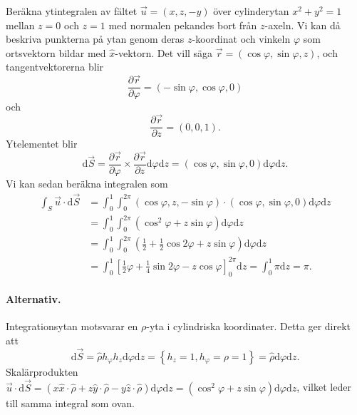 \documentclass[%
oneside,                 %
final,                   %
10pt]{article}
\newenvironment{notice_mdfboxadmon}[1][]{
\begin{notice_mdfboxmdframed}[frametitle=#1]
}
{
\end{notice_mdfboxmdframed}
}
\begin{document}
\begin{notice_mdfboxadmon}

Beräkna ytintegralen av fältet $\vec{u} = (x,z,-y)$ över cylinderytan $x^2 + y^2 = 1$ mellan $z = 0$ och $z = 1$ med normalen pekandes bort från $z$-axeln.  Vi kan då beskriva punkterna på ytan genom deras $z$-koordinat och vinkeln $\varphi$ som ortsvektorn bildar med $\hat{x}$-vektorn.  Det vill säga $\vec{r} = (\cos\varphi , \sin\varphi , z)$, och tangentvektorerna blir
\begin{equation}
  \frac{\partial \vec{r}}{\partial  \varphi} = \left(-\sin\varphi , \cos \varphi ,
0\right)
\end{equation}
och
\begin{equation}
  \frac{\partial \vec{r}}{\partial z} = \left(0,0,1\right).
\end{equation}
Ytelementet blir
\begin{equation}
  \mbox{d} \vec{S} = \frac{\partial \vec{r}}{\partial  \varphi} \times 
\frac{\partial \vec{r}}{\partial z} \mbox{d}\varphi \mbox{d}z = \left(\cos\varphi , \sin \varphi, 0\right) \mbox{d}\varphi \mbox{d}z.
\end{equation}
Vi kan sedan beräkna integralen som
\begin{align}
  \int_S \vec{u} \cdot \mbox{d}\vec{S} &= \int_0^1\int_0^{2\pi} \left(\cos\varphi,
z, -\sin\varphi\right) \cdot \left(\cos\varphi, \sin \varphi, 0\right)
\mbox{d}\varphi \mbox{d}z \nonumber \\
&= \int_0^1\int_0^{2\pi} \left(\cos^2\varphi + z
\sin\varphi\right) \mbox{d}\varphi\mbox{d}z \nonumber \\
&= \int_0^1 \int_0^{2\pi} \left(
\frac{1}{2} + \frac{1}{2}\cos 2\varphi + z\sin\varphi\right) \mbox{d}\varphi
\mbox{d}z \nonumber \\
&= \int_0^1 \left[\frac{1}{2}\varphi + \frac{1}{4}\sin2\varphi - z
\cos\varphi\right]_0^{2\pi} \mbox{d}z = \int_0^1 \pi \mbox{d}z = \pi.
\end{align}

\paragraph{Alternativ.}
Integrationsytan motsvarar en $\rho$-yta i cylindriska koordinater. Detta ger direkt att 
\begin{equation}
  \mbox{d} \vec{S} = \hat{\rho} h_\varphi h_z \mbox{d}\varphi \mbox{d}z = \left\{ h_z=1, h_\varphi = \rho = 1 \right\} = \hat{\rho} \mbox{d}\varphi \mbox{d}z.
\end{equation}
Skalärprodukten $\vec{u} \cdot \mbox{d}\vec{S} = (x\hat{x}\cdot\hat{\rho} + z \hat{y}\cdot\hat{\rho} - y \hat{z} \cdot \hat{\rho} ) \mbox{d}\varphi \mbox{d}z = (\cos^2\varphi + z \sin\varphi) \mbox{d}\varphi \mbox{d}z$, vilket leder till samma integral som ovan.
\end{notice_mdfboxadmon} %







\end{document}
